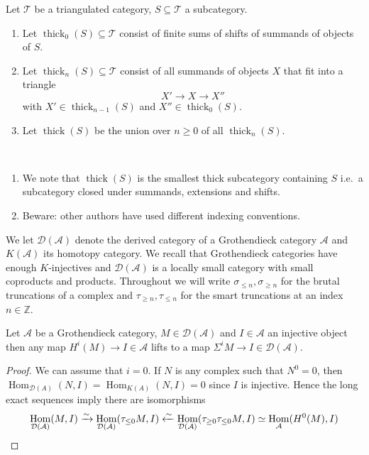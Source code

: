\documentclass[12pt,oneside]{amsart}
\DeclareMathOperator{\Hom}{Hom}
\DeclareMathOperator{\thick}{thick}
\begin{document}
\begin{defn} \label{buildingnotation} Let $\mathcal{T}$ be a triangulated category, $S \subseteq \mathcal{T}$ a subcategory.
\begin{enumerate}
\item Let $\thick_0(S) \subseteq \mathcal{T}$ consist of finite sums of shifts of summands of objects of $S$. 

\item Let $\thick_n(S) \subseteq \mathcal{T}$ consist of all summands of objects $X$ that fit into a triangle
\[
X' \to X \to X''
\]
with $X' \in \thick_{n-1}(S)$ and $X'' \in \thick_0(S)$. 


\item Let $\thick(S)$ be the union over $n\geq 0$ of all $\thick_n(S)$. 

\end{enumerate}
\end{defn}

\begin{remark} \ \begin{enumerate}
\item We note that $\thick(S)$ is the smallest thick subcategory containing $S$ i.e.\ a subcategory closed under summands, extensions and shifts. 
\item Beware: other authors have used different indexing conventions.
\end{enumerate}
\end{remark}

We let $\mathcal{D}(\mathcal{A})$ denote the derived category of a Grothendieck category $\mathcal{A}$ and $K(\mathcal{A})$ its homotopy category. We recall that Grothendieck categories have enough $K$-injectives and $\mathcal{D}(\mathcal{A})$ is a locally small category with small coproducts and products. Throughout we will write $\sigma_{\leq n}, \sigma_{\geq n}$ for the brutal truncations of a complex and $\tau_{\geq n}, \tau_{\leq n}$ for the smart truncations at an index $n \in \mathbb{Z}$. 

\begin{lemma} \label{injlift}
Let $\mathcal{A}$ be a Grothendieck category, $M \in \mathcal{D}(\mathcal{A})$ and $I \in \mathcal{A}$ an injective object then any map $H^i(M) \to I \in \mathcal{A}$ lifts to a map $\Sigma^i M \to I \in \mathcal{D}(\mathcal{A})$. 
\end{lemma}

\begin{proof}
We can assume that $i = 0$. If $N$ is any complex such that $N^0 = 0$, then $\Hom_{\mathcal{D}(A)}(N,I) = \Hom_{K(A)}(N,I) = 0$ since $I$ is injective. Hence the long exact sequences imply there are isomorphisms
\[
\Hom_{\mathcal{D}(\mathcal{A})}(M, I) \xrightarrow{\sim} \Hom_{\mathcal{D}(\mathcal{A})}(\tau_{\leq 0}M, I) \xleftarrow{\sim} \Hom_{\mathcal{D}(\mathcal{A})}(\tau_{\geq 0} \tau_{\leq 0} M,I) \simeq \Hom_{\mathcal{A}}(H^0(M),I) \qedhere
\]
\end{proof}
\end{document}
